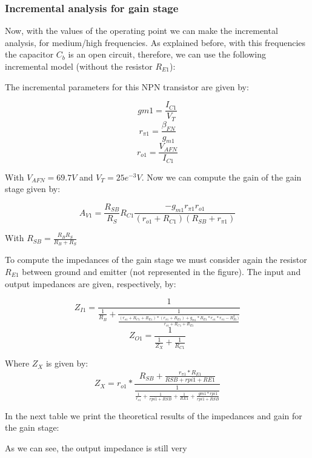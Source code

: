 

\subsubsection{Incremental analysis for gain stage}
\label{subsec:inc1}

\par Now, with the values of the operating point we can make the incremental analysis, for medium/high frequencies. As explained before, with this frequencies the capacitor $C_b$ is an open circuit, therefore, we can use the following incremental model (without the resistor $R_{E1}$):


\par The incremental parameters for this NPN transistor are given by:

\begin{equation}
gm1=\frac{I_{C1}}{V_T}
\end{equation}
\begin{equation}
r_{\pi 1}=\frac{\beta _{FN}}{g_{m1}}
\end{equation}
\begin{equation}
r_{o1}=\frac{V_{AFN}}{I_{C1}}
\end{equation}

\par With $V_{AFN}=69.7V$ and $V_T=25e^{-3}V$. Now we can compute the gain of the gain stage given by:

\begin{equation}
A_{V1}=\frac{R_{SB}}{R_S}R_{C1}\frac{-g_{m1}r_{\pi 1}r_{o1}}{(r_{o1}+R_{C1})(R_{SB}+r_{\pi 1})}
\end{equation}
\par With $R_{SB}=\frac {R_BR_S}{R_B+R_S}$

\par To compute the impedances of the gain stage we must consider again the resistor $R_{E1}$ between ground and emitter (not represented in the figure). The input and output impedances are given, respectively, by:

\begin{equation}
Z_{I1}=\frac{1}{\frac{1}{R_B}+\frac{1}{\frac{(r_{o1}+R_{C1}+R_{E1})*(r_{\pi 1}+R_{E1})+g_{m1}*R_{E1}*r_{o1}*r_{\pi 1} - R_{E1}^2)}{r_{o1}+R_{C1}+R_{E1}}}}
\end{equation} 
\begin{equation}
Z_{O1} = \frac{1}{\frac{1}{Z_X}+\frac{1}{R_{C1}}}
\end{equation}
\par Where $Z_X$ is given by:
\begin{equation}
Z_X = r_{o1}*\frac{R_{SB}+\frac{r_{\pi 1}*R_{E1}}{RSB+rpi1+RE1}}{\frac{1}{\frac{1}{r_{o1}}+\frac{1}{rpi1+RSB}+\frac{1}{RE1}+\frac{gm1*rpi1}{rpi1+RSB}}}
\end{equation}

\par In the next table we print the theoretical results of the impedances and gain for the gain stage:

 
 \par As we can see, the output impedance is still very 
 

